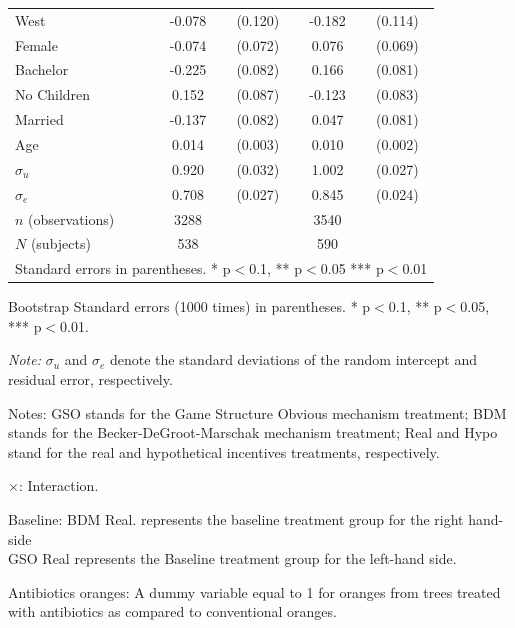 \documentclass[12pt]{article}
\newcommand{\sym}[1]{\rlap{$^{#1}$}}
\begin{document}
\begin{table}[H]
{\begin{tabular}{l*{2}{cc}}
West        &      -0.078         &     (0.120)&	-0.182         &     (0.114)\\
Female      &      -0.074         &     (0.072)&	0.076         &     (0.069)\\
Bachelor    &      -0.225\sym{***}&     (0.082)&	0.166\sym{**} &     (0.081)\\
No Children &       0.152\sym{*}  &     (0.087)&	-0.123         &     (0.083)\\
Married     &      -0.137\sym{*}  &     (0.082)&	0.047         &     (0.081)\\
Age         &       0.014\sym{***}&     (0.003)&	0.010\sym{***}&     (0.002)\\
$\sigma_u$     &       0.920\sym{***}&     (0.032)&	1.002\sym{***}&     (0.027)\\
$\sigma_e$   &       0.708\sym{***}&     (0.027)&	0.845\sym{***}&     (0.024)\\
\hline
\(n\) (observations)    &        3288         &            &        3540         &            \\
\(N\) (subjects)      &        538         &            &        590         &            \\
\hline \hline
\multicolumn{5}{l}{\footnotesize Standard errors in parentheses. * p$<$0.1, ** p$<$0.05 *** p$<$0.01}\\
\end{tabular}
}

\begin{tablenotes}
            \footnotesize
           \item Bootstrap Standard errors (1000 times) in parentheses. * p$<$0.1, ** p$<$0.05, *** p$<$0.01.
            \item \textit{Note:} $\sigma_u$ and $\sigma_e$ denote the standard deviations of the random intercept and residual error, respectively.
            \item Notes: GSO stands for the Game Structure Obvious mechanism treatment; BDM stands for the Becker-DeGroot-Marschak mechanism treatment; Real and Hypo stand for the real and hypothetical incentives treatments, respectively.
           \item $\times$: Interaction.
           \item Baseline: BDM Real. represents the baseline treatment group for the right hand-side \\
           GSO Real represents the Baseline treatment group for the left-hand side.
           \item Antibiotics oranges: A dummy variable equal to 1 for oranges from trees treated with antibiotics as compared to conventional oranges.
        \end{tablenotes}
\end{table}
\end{document}
